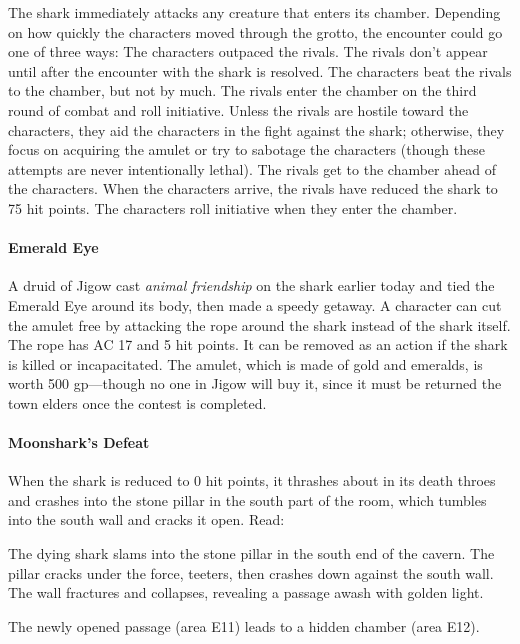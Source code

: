 \documentclass[10pt,a4,twoside,twocolumn,openany,nodeprecatedcode]{dndbook}
\begin{document}
The shark immediately attacks any creature that enters its chamber. Depending on how quickly the characters moved through the grotto, the encounter could go one of three ways:
{{The characters outpaced the rivals. The rivals don't appear until after the encounter with the shark is resolved.}}
{{The characters beat the rivals to the chamber, but not by much. The rivals enter the chamber on the third round of combat and roll initiative. Unless the rivals are hostile toward the characters, they aid the characters in the fight against the shark; otherwise, they focus on acquiring the amulet or try to sabotage the characters (though these attempts are never intentionally lethal).}}
{{The rivals get to the chamber ahead of the characters. When the characters arrive, the rivals have reduced the shark to 75 hit points. The characters roll initiative when they enter the chamber.}}
\paragraph{Emerald Eye}
A druid of Jigow cast \textit{animal friendship} on the shark earlier today and tied the Emerald Eye around its body, then made a speedy getaway. A character can cut the amulet free by attacking the rope around the shark instead of the shark itself. The rope has AC 17 and 5 hit points. It can be removed as an action if the shark is killed or incapacitated. The amulet, which is made of gold and emeralds, is worth 500 gp—though no one in Jigow will buy it, since it must be returned the town elders once the contest is completed.
\paragraph{Moonshark's Defeat}
When the shark is reduced to 0 hit points, it thrashes about in its death throes and crashes into the stone pillar in the south part of the room, which tumbles into the south wall and cracks it open. Read:
\begin{DndReadAloud}{}
The dying shark slams into the stone pillar in the south end of the cavern. The pillar cracks under the force, teeters, then crashes down against the south wall. The wall fractures and collapses, revealing a passage awash with golden light.
\end{DndReadAloud}

The newly opened passage (area E11) leads to a hidden chamber (area E12).
\end{document}
